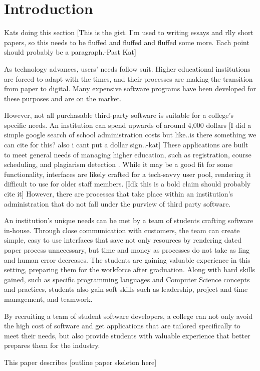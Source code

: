 \section{Introduction}
Kats doing this section
[This is the gist. I'm used to writing essays and rlly short papers, so this needs to be fluffed and fluffed and fluffed some more. Each point should probably be a paragraph.-Past Kat]

As technology advances, users' needs follow suit. Higher educational institutions are forced to adapt with the times, and their processes are making the transition from paper to digital. Many expensive software programs have been developed for these purposes and are on the market. 

However, not all purchasable third-party software is suitable for a college's specific needs. An institution can spend upwards of around 4,000 dollars [I did a simple google search of school administration costs but like..is there something we can cite for this? also i cant put a dollar sign..-kat] These applications are built to meet general needs of managing higher education, such as registration, course scheduling, and plagiarism detection \cite{plagarismsoftware}. While it may be a good fit for some functionality, interfaces are likely crafted for a tech-savvy user pool, rendering it difficult to use for older staff members. [Idk this is a bold claim should probably cite it] However, there are processes that take place within an institution's administration that do not fall under the purview of third party software.

An institution's unique needs can be met by a team of students crafting software in-house. Through close communication with customers, the team can create simple, easy to use interfaces that save not only resources by rendering dated paper process unnecessary, but time and money as processes do not take as ling and human error decreases. The students are gaining valuable experience in this setting, preparing them for the workforce after graduation. Along with hard skills gained, such as specific programming languages and Computer Science concepts and practices, students also gain soft skills \cite{softskills} such as leadership, project and time management, and teamwork.

By recruiting a team of student software developers, a college can not only avoid the high cost of software and get applications that are tailored specifically to meet their needs, but also provide students with valuable experience that better prepares them for the industry. 

This paper describes [outline paper skeleton here]

